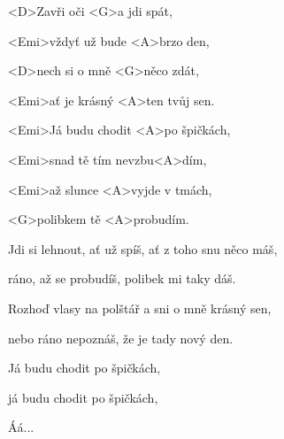 

\zs
<D>Zavři oči <G>a jdi spát,

<Emi>vždyť už bude <A>brzo den,

<D>nech si o mně <G>něco zdát,

<Emi>ať je krásný <A>ten tvůj sen.
\ks

\zr
<Emi>Já budu chodit <A>po špičkách,

<Emi>snad tě tím nevzbu<A>dím,

<Emi>až slunce <A>vyjde v tmách,

<G>polibkem tě <A>probudím.
\kr

\zs
Jdi si lehnout, ať už spíš, ať z toho snu něco máš,

ráno, až se probudíš, polibek mi taky dáš.
\ks

\zr\kr

\zs
Rozhoď vlasy na polštář a sni o mně krásný sen,

nebo ráno nepoznáš, že je tady nový den.
\ks

Já budu chodit po špičkách,

já budu chodit po špičkách,

Áá...

\kp
